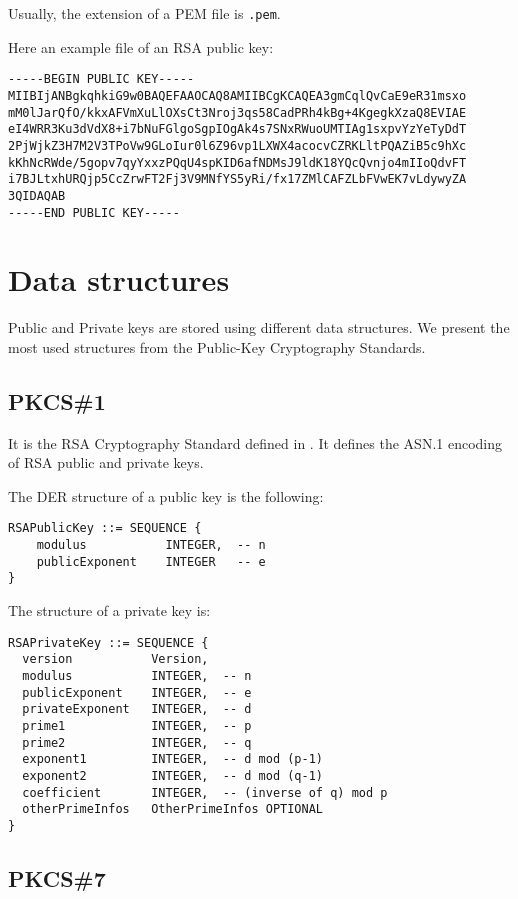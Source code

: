 \documentclass[11pt]{article}
\begin{document}
Usually, the extension of a PEM file is \verb|.pem|.

Here an example file of an RSA public key:

\begin{verbatim}
-----BEGIN PUBLIC KEY-----
MIIBIjANBgkqhkiG9w0BAQEFAAOCAQ8AMIIBCgKCAQEA3gmCqlQvCaE9eR31msxo
mM0lJarQfO/kkxAFVmXuLlOXsCt3Nroj3qs58CadPRh4kBg+4KgegkXzaQ8EVIAE
eI4WRR3Ku3dVdX8+i7bNuFGlgoSgpIOgAk4s7SNxRWuoUMTIAg1sxpvYzYeTyDdT
2PjWjkZ3H7M2V3TPoVw9GLoIur0l6Z96vp1LXWX4acocvCZRKLltPQAZiB5c9hXc
kKhNcRWde/5gopv7qyYxxzPQqU4spKID6afNDMsJ9ldK18YQcQvnjo4mIIoQdvFT
i7BJLtxhURQjp5CcZrwFT2Fj3V9MNfYS5yRi/fx17ZMlCAFZLbFVwEK7vLdywyZA
3QIDAQAB
-----END PUBLIC KEY-----
\end{verbatim}

\section{Data structures}

Public and Private keys are stored using different data structures.
We present the most used structures from the Public-Key Cryptography Standards.

\subsection{PKCS\#1}

It is the RSA Cryptography Standard defined in \cite{rfc8017}.
It defines the ASN.1 encoding of RSA public and private keys.

The DER structure of a public key is the following:

\begin{verbatim}
RSAPublicKey ::= SEQUENCE {
    modulus           INTEGER,  -- n
    publicExponent    INTEGER   -- e
}
\end{verbatim}

The structure of a private key is:

\begin{verbatim}
RSAPrivateKey ::= SEQUENCE {
  version           Version,
  modulus           INTEGER,  -- n
  publicExponent    INTEGER,  -- e
  privateExponent   INTEGER,  -- d
  prime1            INTEGER,  -- p
  prime2            INTEGER,  -- q
  exponent1         INTEGER,  -- d mod (p-1)
  exponent2         INTEGER,  -- d mod (q-1)
  coefficient       INTEGER,  -- (inverse of q) mod p
  otherPrimeInfos   OtherPrimeInfos OPTIONAL
}
\end{verbatim}

\subsection{PKCS\#7}
\end{document}
